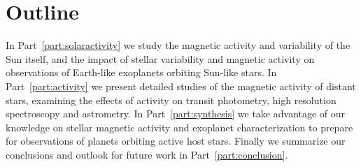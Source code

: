 \section{Outline} \label{sec:outline}

In Part~\ref{part:solaractivity} we study the magnetic activity and variability of the Sun itself, and the impact of stellar variability and magnetic activity on observations of Earth-like exoplanets orbiting Sun-like stars. In Part~\ref{part:activity} we present detailed studies of the magnetic activity of distant stars, examining the effects of activity on transit photometry, high resolution spectroscopy and astrometry. %
In Part~\ref{part:synthesis} we take advantage of our knowledge on stellar magnetic activity and exoplanet characterization to prepare for observations of planets orbiting active host stars. Finally we summarize our conclusions and outlook for future work in Part~\ref{part:conclusion}. 
